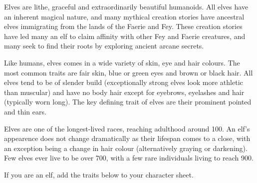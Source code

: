 \documentclass[10pt,twoside]{article}
\begin{document}
Elves are lithe, graceful and extraordinarily beautiful humanoids. All elves have an inherent magical nature, and many mythical creation stories have ancestral elves immigrating from the lands of the Faerie and Fey. These creation stories have led many an elf to claim affinity with other Fey and Faerie creatures, and many seek to find their roots by exploring ancient arcane secrets.

Like humans, elves comes in a wide variety of skin, eye and hair colours. The most common traits are fair skin, blue or green eyes and brown or black hair. All elves tend to be of slender build (exceptionally strong elves look more athletic than muscular) and have no body hair except for eyebrows, eyelashes and hair (typically worn long). The key defining trait of elves are their prominent pointed and thin ears.

Elves are one of the longest-lived races, reaching adulthood around 100. An elf's appearence does not change dramatically as their lifespan comes to a close, with an exception being a change in hair colour (alternatively graying or darkening). Few elves ever live to be over 700, with a few rare individuals living to reach 900.

If you are an elf, add the traits below to your character sheet.
\end{document}
